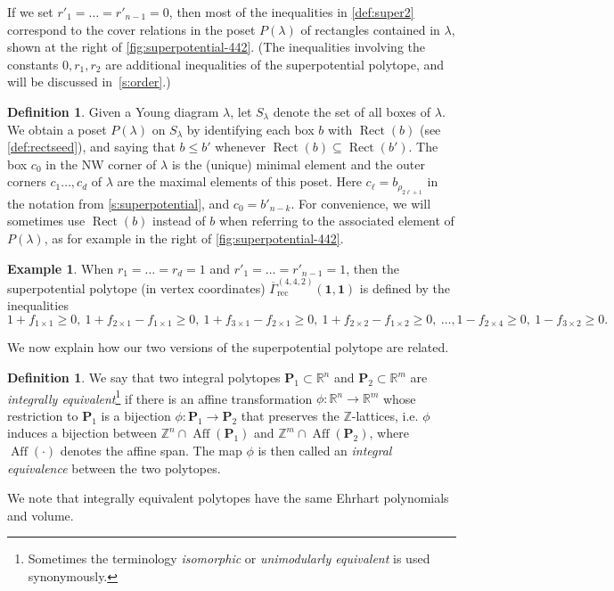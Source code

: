 \documentclass{amsart}
\theoremstyle{definition}
\newtheorem{example}[thm]{Example}
\newtheorem{definition}[thm]{Definition}
\numberwithin{equation}{section}
\newcommand{\aff}{\operatorname{Aff}}
\newcommand{\R}{\mathbb R}
\newcommand{\Ppoly}{\mathbf P}
\newcommand{\rect}{\mathrm{rec}}
\newcommand{\rGamma}{\overline{\Gamma}}
\def\Rect{\operatorname{Rect}}
\newcommand{\Z}{\mathbb{Z}}
\begin{document}
If we set $r'_1 = \dots = r'_{n-1}=0$, 
then most of the inequalities 
in \cref{def:super2}  
correspond to the cover relations in the poset $P(\lambda)$
of rectangles contained in $\lambda$, shown 
at the right of 
\cref{fig:superpotential-442}.  (The inequalities involving the constants $0, r_1, r_2$ are additional 
inequalities of the superpotential polytope, and will be discussed in~\cref{s:order}.)

\begin{definition}\label{def:posetlambda}
Given a Young diagram $\lambda$, 
let $S_{\lambda}$ denote 
 the set of all 
boxes of $\lambda$.
We obtain a poset $P({\lambda})$ on $S_{\lambda}$ by 
identifying each box $b$ with 
$\Rect(b)$ (see \cref{def:rectseed}), and saying that 
$b \leq b'$ whenever $\Rect(b) \subseteq \Rect(b')$.  
The box $c_0$ in the NW corner of $\lambda$ is the (unique) minimal element and the outer corners $c_1\dotsc, c_d$
of $\lambda$
	are the maximal elements of this poset. Here $c_\ell=b_{\rho_{2\ell+1}}$ in the notation from \cref{s:superpotential}, and $c_0=b'_{n-k}$.  
For convenience, we will sometimes use  $\Rect(b)$ instead of $b$ when referring to the associated element of $P(\lambda)$, as for example in the 
	right of 
\cref{fig:superpotential-442}.
\end{definition}


\begin{example}\label{ex:442}
		When $r_1=\dots=r_d=1$ and $r'_1=\dots=r'_{n-1}=1$, then the superpotential polytope (in vertex coordinates)
	$\rGamma_{\rect}^{(4,4,2)}(\mathbf{1},\mathbf{1})$
is defined by the inequalities
$$1+f_{1 \times 1} \geq 0, \
1+f_{2 \times 1}-f_{1 \times 1} \geq 0, \
1+f_{3 \times 1}-f_{2 \times 1} \geq 0, \
1+f_{2 \times 2}-f_{1 \times 2} \geq 0,\ \dots  ,
1-f_{2 \times 4} \geq 0, \
1-f_{3 \times 2} \geq 0.$$

\end{example}

We now explain how our two versions 
	of the superpotential polytope 
	are related.

\begin{definition}
	We say that two integral polytopes 
  $\Ppoly_1 \subset \R^n$ and $\Ppoly_2 \subset \R^m$ are \emph{integrally
	equivalent}\footnote{Sometimes the terminology  
 \emph{isomorphic} or
	\emph{unimodularly equivalent} is used synonymously.}
	if there is an affine transformation
   $\phi:\R^n \to \R^m$ whose restriction to $\Ppoly_1$
    is a bijection $\phi:\Ppoly_1 \to \Ppoly_2$  that preserves the $\Z$-lattices,
    i.e. $\phi$ induces a bijection between
     $\Z^n \cap \aff(\Ppoly_1)$ and $\Z^m \cap \aff(\Ppoly_2)$, where
     $\aff(\cdot)$ denotes the affine span.  The map $\phi$
      is then called an \emph{integral equivalence} between the two polytopes.
\end{definition}
We note that integrally equivalent polytopes 
have the same Ehrhart polynomials
and  volume. 
\end{document}
